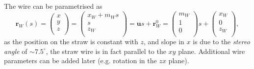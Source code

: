 \documentclass[a4paper,11pt]{article}
\begin{document}
The wire can be parametrised as 
\begin{equation}
\textbf{r}_W(s) = \begin{pmatrix}x\\y\\z\\\end{pmatrix} = \begin{pmatrix}x_W + m_W s\\ s\\  z_W\\\end{pmatrix} = \textbf{u}s+\textbf{r}_W^0=\begin{pmatrix} m_W \\ 1\\  0\\\end{pmatrix}s + \begin{pmatrix}x_W  \\0 \\  z_W\\\end{pmatrix},
\label{eq:wire}
\end{equation}
as the position on the straw is constant with $z$, and slope in $x$ is due to the \textit{stereo angle} of $\sim 7.5^{\circ}$, the straw wire is in fact parallel to the $xy$ plane. Additional wire parameters can be added later (e.g. rotation in the $zx$ plane). 
\end{document}
